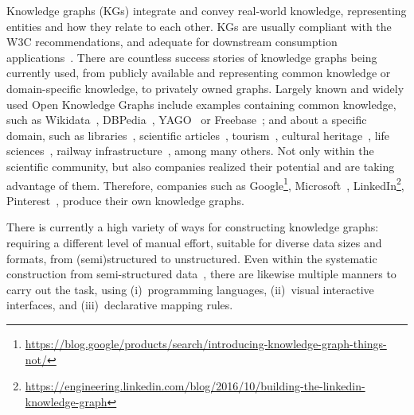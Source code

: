Knowledge graphs (KGs) integrate and convey real-world knowledge, representing entities and how they relate to each other.
KGs are usually compliant with the W3C recommendations, and adequate for downstream consumption applications~\parencite{hogan2021kg}.
There are countless success stories of knowledge graphs being currently used, from publicly available and representing common knowledge or domain-specific knowledge, to privately owned graphs. 
Largely known and widely used Open Knowledge Graphs include examples containing common knowledge, such as Wikidata~\parencite{vrandevcic2014wikidata}, DBPedia~\parencite{auer2007dbpedia}, YAGO~\parencite{pellissier2020yago} or Freebase~\parencite{bollacker2007freebase}; 
and about a specific domain, such as 
libraries~\parencite{vila2013datos}, 
scientific articles~\parencite{stocker2023orkg,farber2023semopenalex}, 
tourism~\parencite{karle2018building}, 
cultural heritage~\parencite{carriero2019arco}, 
life sciences~\parencite{dumontier2014bio2rdf,pinero2020disgenet},
railway infrastructure~\parencite{rojas2021leveraging}, among many others. 
Not only within the scientific community, but also companies realized their potential and are taking advantage of them. 
Therefore, companies such as
Google\footnote{\url{https://blog.google/products/search/introducing-knowledge-graph-things-not/}},
Microsoft~\parencite{farber2019microsoft},
LinkedIn\footnote{\url{https://engineering.linkedin.com/blog/2016/10/building-the-linkedin-knowledge-graph}}, 
Pinterest~\parencite{goncalves2019pinterest},
produce their own knowledge graphs. 


There is currently a high variety of ways for constructing knowledge graphs: requiring a different level of manual effort, suitable for diverse data sizes and formats, from (semi)structured to unstructured. %
Even within the systematic construction from semi-structured data~\parencite{Poggi2008}, there are likewise multiple manners to carry out the task, using (i)~programming languages, (ii)~visual interactive interfaces, and (iii)~declarative mapping rules. 

